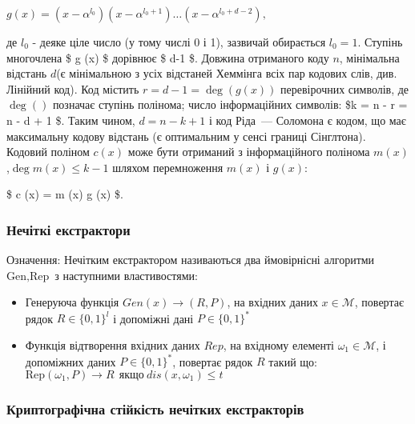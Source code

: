 \documentclass[11pt]{article}
\providecommand{\tightlist}{%
      \setlength{\itemsep}{0pt}\setlength{\parskip}{0pt}}
\begin{document}
\(g(x) = (x - \alpha^{l_0})(x - \alpha^{l_0+1})\dots(x - \alpha^{l_0+d-2}),\)

де \(l_0\) - деяке ціле число (у тому числі 0 і 1), зазвичай обирається
\(𝑙_0 = 1\). Ступінь многочлена \$ g (x) \$ дорівнює \$ d-1 \$. Довжина
отриманого коду \(n\), мінімальна відстань \(d\)(є мінімальною з усіх
відстаней Хеммінга всіх пар кодових слів, див. Лінійний код). Код
містить \(r=d-1=\deg (g(x))\) перевірочних символів, де \(\deg()\)
позначає ступінь полінома; число інформаційних символів: \$k = n - r = n
- d + 1 \$. Таким чином, \(\textstyle d = n - k + 1\) і код Ріда~---
Соломона є кодом, що має максимальну кодову відстань (є оптимальним у
сенсі границі Сінглтона). Кодовий поліном \(c(x)\) може бути отриманий з
інформаційного полінома \(m(x)\),\(\deg m(x) \leqslant k-1\) шляхом
перемноження \(m(x)\) і \(g(x)\):

\$ c (x) = m (x) g (x) \$.

    \hypertarget{ux43dux435ux447ux456ux442ux43aux456-ux435ux43aux441ux442ux440ux430ux43aux442ux43eux440ux438}{%
\subsubsection{Нечіткі
екстрактори}\label{ux43dux435ux447ux456ux442ux43aux456-ux435ux43aux441ux442ux440ux430ux43aux442ux43eux440ux438}}

Означення: Нечітким екстрактором називаються два ймовірнісні алгоритми
\(\text{Gen}, \text{Rep}\) з наступними властивостями:

\begin{itemize}
\tightlist
\item
  Генеруюча функція \(Gen(x) \rightarrow (R,P)\), на вхідних даних
  \(x \in \mathcal{M}\), повертає рядок \(R \in \{0,1\}^l\) і допоміжні
  дані \(P \in \{0,1\}^*\)
\item
  Функція відтворення вхідних даних \(Rep\), на вхідному елементі
  \(\omega_1 \in \mathcal{M}\), і допоміжних даних \(P \in \{0,1\}^*\),
  повертає рядок \(R\) такий що:\\
  \(\text{Rep}(\omega_1,P) \rightarrow R~~\text{якщо}~  dis(x,\omega_1)\leq t\)
\end{itemize}

    \hypertarget{ux43aux440ux438ux43fux442ux43eux433ux440ux430ux444ux456ux447ux43dux430-ux441ux442ux456ux439ux43aux456ux441ux442ux44c-ux43dux435ux447ux456ux442ux43aux438ux445-ux435ux43aux441ux442ux440ux430ux43aux442ux43eux440ux456ux432}{%
\subsubsection{Криптографічна стійкість нечітких
екстракторів}\label{ux43aux440ux438ux43fux442ux43eux433ux440ux430ux444ux456ux447ux43dux430-ux441ux442ux456ux439ux43aux456ux441ux442ux44c-ux43dux435ux447ux456ux442ux43aux438ux445-ux435ux43aux441ux442ux440ux430ux43aux442ux43eux440ux456ux432}}
\end{document}
